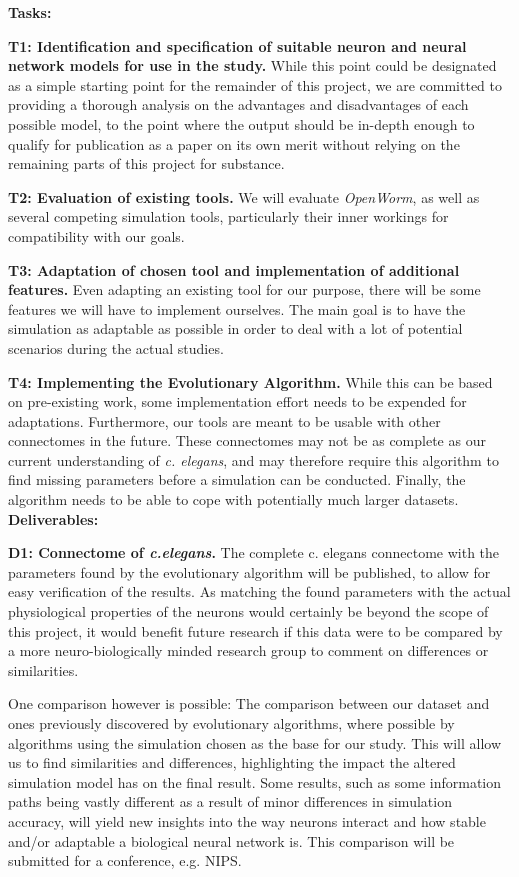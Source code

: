 \documentclass[a4paper,11pt]{article}
\begin{document}
\textbf{Tasks:}

\textbf{T1: Identification and specification of suitable neuron and neural network models for use in the study.}
While this point could be designated as a simple starting point for the remainder of this project, we are committed to providing a thorough analysis on the advantages and disadvantages of each possible model, to the point where the output should be in-depth enough to qualify for publication as a paper on its own merit without relying on the remaining parts of this project for substance.

\textbf{T2: Evaluation of existing tools.}
We will evaluate \emph{OpenWorm}, as well as several competing simulation tools, particularly their inner workings for compatibility with our goals.

\textbf{T3: Adaptation of chosen tool and implementation of additional features.}
Even adapting an existing tool for our purpose, there will be some features we will have to implement ourselves. The main goal is to have the simulation as adaptable as possible in order to deal with a lot of potential scenarios during the actual studies.

\textbf{T4: Implementing the Evolutionary Algorithm.} While this can be based on pre-existing work, some implementation effort needs to be expended for adaptations. Furthermore, our tools are meant to be usable with other connectomes in the future. These connectomes may not be as complete as our current understanding of \emph{c. elegans}, and may therefore require this algorithm to find missing parameters before a simulation can be conducted. Finally, the algorithm needs to be able to cope with potentially much larger datasets.
\\[0,2cm]



\textbf{Deliverables:}

\textbf{D1: Connectome of \emph{c.elegans}.}
The complete c. elegans connectome with the parameters found by the evolutionary algorithm will be published, to allow for easy verification of the results. As matching the found parameters with the actual physiological properties of the neurons would certainly be beyond the scope of this project, it would benefit future research if this data were to be compared by a more neuro-biologically minded research group to comment on differences or similarities.

One comparison however is possible: The comparison between our dataset and ones previously discovered by evolutionary algorithms, where possible by algorithms using the simulation chosen as the base for our study. This will allow us to find similarities and differences, highlighting the impact the altered simulation model has on the final result. Some results, such as some information paths being vastly different as a result of minor differences in simulation accuracy, will yield new insights into the way neurons interact and how stable and/or adaptable a biological neural network is. This comparison will be submitted for a conference, e.g. NIPS. 
\end{document}
